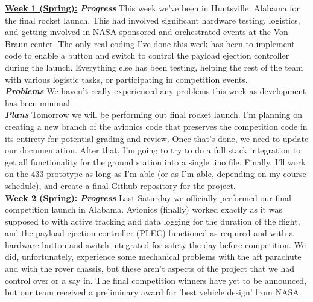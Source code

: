 \documentclass[onecolumn, draftclsnofoot, 10pt, compsoc]{IEEEtran}
\begin{document}
\underline{\textbf{Week 1 (Spring):}}
\newline\textbf{\textit{{Progress}}}
\newline This week we've been in Huntsville, Alabama for the final rocket launch. This had involved significant hardware testing, logistics, and getting involved in NASA sponsored and orchestrated events at the Von Braun center. The only real coding I've done this week has been to implement code to enable a button and switch to control the payload ejection controller during the launch. Everything else has been testing, helping the rest of the team with various logistic tasks, or participating in competition events. \\

\textbf{\textit{{Problems}}}
\newline We haven't really experienced any problems this week as development has been minimal. \\

\textbf{\textit{{Plans}}}
\newline Tomorrow we will be performing out final rocket launch. I'm planning on creating a new branch of the avionics code that preserves the competition code in its entirety for potential grading and review. Once that's done, we need to update our documentation. After that, I'm going to try to do a full stack integration to get all functionality for the ground station into a single .ino file. Finally, I'll work on the 433 prototype as long as I'm able (or as I'm able, depending on my course schedule), and create a final Github repository for the project. \\

\underline{\textbf{Week 2 (Spring):}}
\newline\textbf{\textit{{Progress}}}
\newline Last Saturday we officially performed our final competition launch in Alabama. Avionics (finally) worked exactly as it was supposed to with active tracking and data logging for the duration of the flight, and the payload ejection controller (PLEC) functioned as required and with a hardware button and switch integrated for safety the day before competition. We did, unfortunately, experience some mechanical problems with the aft parachute and with the rover chassis, but these aren't aspects of the project that we had control over or a say in. The final competition winners have yet to be announced, but our team received a preliminary award for 'best vehicle design' from NASA. \\
\end{document}
